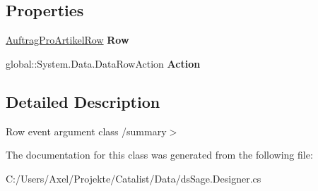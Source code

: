 \subsection*{Properties}
\begin{DoxyCompactItemize}
\item 
\hyperlink{class_products_1_1_data_1_1ds_sage_1_1_auftrag_pro_artikel_row}{Auftrag\+Pro\+Artikel\+Row} {\bfseries Row}\hypertarget{class_products_1_1_data_1_1ds_sage_1_1_auftrag_pro_artikel_row_change_event_ae2df4dc3f86c2c5559547b42d70e5a0b}{}\label{class_products_1_1_data_1_1ds_sage_1_1_auftrag_pro_artikel_row_change_event_ae2df4dc3f86c2c5559547b42d70e5a0b}

\item 
global\+::\+System.\+Data.\+Data\+Row\+Action {\bfseries Action}\hypertarget{class_products_1_1_data_1_1ds_sage_1_1_auftrag_pro_artikel_row_change_event_addb4552ce5f6f663a332303e7f497949}{}\label{class_products_1_1_data_1_1ds_sage_1_1_auftrag_pro_artikel_row_change_event_addb4552ce5f6f663a332303e7f497949}

\end{DoxyCompactItemize}


\subsection{Detailed Description}
Row event argument class /summary$>$ 

The documentation for this class was generated from the following file\+:\begin{DoxyCompactItemize}
\item 
C\+:/\+Users/\+Axel/\+Projekte/\+Catalist/\+Data/ds\+Sage.\+Designer.\+cs\end{DoxyCompactItemize}
